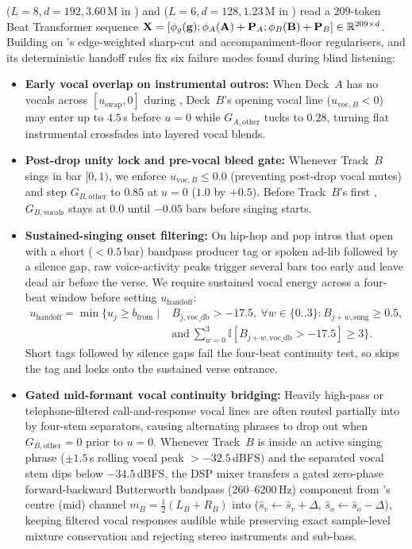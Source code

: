  ($L=8, d=192, 3.60$\,M in ) and  ($L=6, d=128, 1.23$\,M in ) read a $209$-token Beat Transformer sequence $\mathbf{X} = [\phi_g(\mathbf{g}); \phi_A(\mathbf{A}) + \mathbf{P}_A; \phi_B(\mathbf{B}) + \mathbf{P}_B] \in \mathbb{R}^{209 \times d}$. Building on 's edge-weighted sharp-cut and accompaniment-floor regularisers,  and its deterministic handoff rules fix six failure modes found during blind listening:
\begin{itemize}
  \item \textbf{Early vocal overlap on instrumental outros:} When Deck~$A$ has no vocals across $[u_{\text{swap}}, 0]$ during , Deck~$B$'s opening vocal line ($u_{\text{voc},B} < 0$) may enter up to $4.5$\,s before $u=0$ while $G_{A,\text{other}}$ tucks to $0.28$, turning flat instrumental crossfades into layered vocal blends.
  \item \textbf{Post-drop unity lock and pre-vocal bleed gate:} Whenever Track~$B$ sings in bar $[0, 1)$, we enforce $u_{\text{voc},B} \le 0.0$ (preventing post-drop vocal mutes) and step $G_{B,\text{other}}$ to $0.85$ at $u=0$ ($1.0$ by $+0.5$). Before Track~$B$'s first , $G_{B,\text{vocals}}$ stays at $0.0$ until $-0.05$ bars before singing starts.
  \item \textbf{Sustained-singing onset filtering:} On hip-hop and pop intros that open with a short ($<0.5$\,bar) bandpass producer tag or spoken ad-lib followed by a silence gap, raw voice-activity peaks trigger  several bars too early and leave dead air before the verse. We require sustained vocal energy across a four-beat window before setting $u_{\text{handoff}}$:
  \begin{equation}
  \begin{aligned}
    u_{\text{handoff}} = \min\Big\{ u_j \ge b_{\text{from}} \;\Big|\;
      &B_{j,\text{voc\_db}} > -17.5,\ \forall w \in \{0..3\}: B_{j+w,\text{sung}} \ge 0.5,\\[-2pt]
      &\text{and}\ \sum_{w=0}^3 \mathbb{I}[B_{j+w,\text{voc\_db}} > -17.5] \ge 3 \Big\}.
  \end{aligned}
    \label{eq:handoff}
  \end{equation}
  Short tags followed by silence gaps fail the four-beat continuity test, so  skips the tag and locks onto the sustained verse entrance.
  \item \textbf{Gated mid-formant vocal continuity bridging:} Heavily high-pass or telephone-filtered call-and-response vocal lines are often routed partially into  by four-stem separators, causing alternating phrases to drop out when $G_{B,\text{other}} = 0$ prior to $u=0$. Whenever Track~$B$ is inside an active singing phrase ($\pm 1.5$\,s rolling vocal peak $> -32.5$\,dBFS) and the separated vocal stem dips below $-34.5$\,dBFS, the DSP mixer transfers a gated zero-phase forward-backward Butterworth bandpass ($260$--$6200$\,Hz) component from 's centre (mid) channel $m_B = \tfrac{1}{2}(L_B + R_B)$ into  ($\hat{s}_v \leftarrow \hat{s}_v + \Delta$, $\hat{s}_o \leftarrow \hat{s}_o - \Delta$), keeping filtered vocal responses audible while preserving exact sample-level mixture conservation and rejecting stereo instruments and sub-bass.

\end{itemize}
